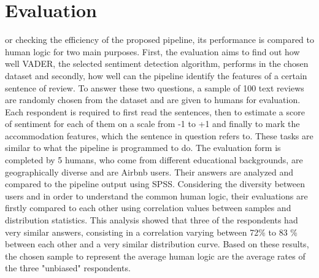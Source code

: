 %
%


\let\textcircled=\pgftextcircled
\chapter{Evaluation}
\label{chap:eva}
or checking the efficiency of the proposed pipeline, its performance is compared to human logic for two main purposes. First, the evaluation aims to find out how well VADER, the selected sentiment detection algorithm, performs in the chosen dataset and secondly, how well can the pipeline identify the features of a certain sentence of review. To answer these two questions, a sample of 100 text reviews are randomly chosen from the dataset and are given to humans for evaluation. Each respondent is required to first read the sentences, then to estimate a score of sentiment for each of them on a scale from -1 to +1 and finally to mark the accommodation features, which the sentence in question refers to. These tasks are similar to what the pipeline is programmed to do. 
The evaluation form is completed by 5 humans, who come from different educational backgrounds, are geographically diverse and are Airbnb users. Their answers are analyzed and compared to the pipeline output using SPSS. Considering the diversity between users and in order to understand the common human logic, their evaluations are firstly compared to each other using correlation values between samples and distribution statistics. This analysis showed that three of the respondents had very similar answers, consisting in a correlation varying between 72\% to 83 \% between each other and a very similar distribution curve. 
Based on these results, the chosen sample to represent the average human logic are the average rates of the three "unbiased" respondents. 


